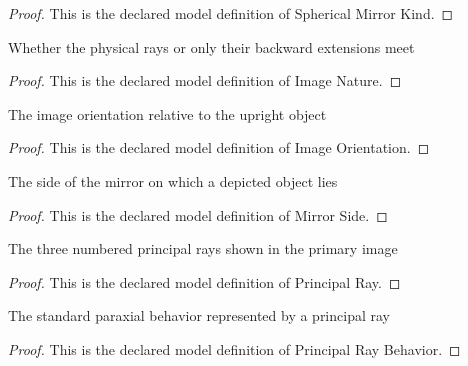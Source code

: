 \begin{proof}
  This is the declared model definition of Spherical Mirror Kind.
\end{proof}
\begin{definition}
  \label{def:physics:phyx-mini-0140:phyxminiproblems-problemphyxmini0140-imagenature}
  Whether the physical rays or only their backward extensions meet
\end{definition}
\begin{proof}
  This is the declared model definition of Image Nature.
\end{proof}
\begin{definition}
  \label{def:physics:phyx-mini-0140:phyxminiproblems-problemphyxmini0140-imageorientation}
  The image orientation relative to the upright object
\end{definition}
\begin{proof}
  This is the declared model definition of Image Orientation.
\end{proof}
\begin{definition}
  \label{def:physics:phyx-mini-0140:phyxminiproblems-problemphyxmini0140-mirrorside}
  The side of the mirror on which a depicted object lies
\end{definition}
\begin{proof}
  This is the declared model definition of Mirror Side.
\end{proof}
\begin{definition}
  \label{def:physics:phyx-mini-0140:phyxminiproblems-problemphyxmini0140-principalray}
  The three numbered principal rays shown in the primary image
\end{definition}
\begin{proof}
  This is the declared model definition of Principal Ray.
\end{proof}
\begin{definition}
  \label{def:physics:phyx-mini-0140:phyxminiproblems-problemphyxmini0140-principalraybehavior}
  The standard paraxial behavior represented by a principal ray
\end{definition}
\begin{proof}
  This is the declared model definition of Principal Ray Behavior.
\end{proof}

